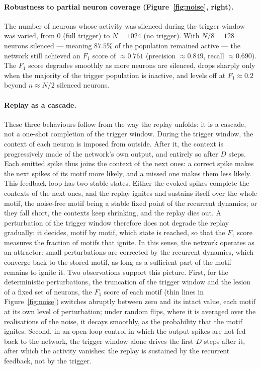 \documentclass{scrartcl}
\begin{document}
\paragraph{Robustness to partial neuron coverage (Figure~\ref{fig:noise}, right).}
The number of neurons whose activity was silenced during the trigger window was varied, from $0$ (full trigger) to $N = 1024$ (no trigger). With $N/8 = 128$ neurons silenced --- meaning $87.5\%$ of the population remained active --- the network still achieved an $F_1$ score of $\approx 0.761$ (precision $\approx 0.849$, recall $\approx 0.690$). The $F_1$ score degrades smoothly as more neurons are silenced, drops sharply only when the majority of the trigger population is inactive, and levels off at $F_1 \approx 0.2$ beyond $n \approx N/2$ silenced neurons.

\paragraph{Replay as a cascade.}
These three behaviours follow from the way the replay unfolds: it is a cascade, not a one-shot completion of the trigger window. During the trigger window, the context of each neuron is imposed from outside. After it, the context is progressively made of the network's own output, and entirely so after $D$ steps. Each emitted spike thus joins the context of the next ones: a correct spike makes the next spikes of its motif more likely, and a missed one makes them less likely. This feedback loop has two stable states. Either the evoked spikes complete the contexts of the next ones, and the replay ignites and sustains itself over the whole motif, the noise-free motif being a stable fixed point of the recurrent dynamics; or they fall short, the contexts keep shrinking, and the replay dies out. A perturbation of the trigger window therefore does not degrade the replay gradually: it decides, motif by motif, which state is reached, so that the $F_1$ score measures the fraction of motifs that ignite. In this sense, the network operates as an attractor: small perturbations are corrected by the recurrent dynamics, which converge back to the stored motif, as long as a sufficient part of the motif remains to ignite it. Two observations support this picture. First, for the deterministic perturbations, the truncation of the trigger window and the lesion of a fixed set of neurons, the $F_1$ score of each motif (thin lines in Figure~\ref{fig:noise}) switches abruptly between zero and its intact value, each motif at its own level of perturbation; under random flips, where it is averaged over the realisations of the noise, it decays smoothly, as the probability that the motif ignites. Second, in an open-loop control in which the output spikes are not fed back to the network, the trigger window alone drives the first $D$ steps after it, after which the activity vanishes: the replay is sustained by the recurrent feedback, not by the trigger.
\end{document}
